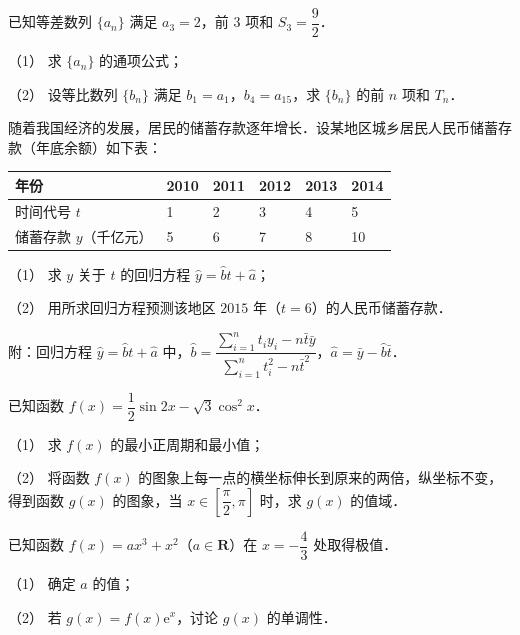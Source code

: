 \begin{question}
已知等差数列 $\{a_{n}\}$ 满足 $a_{3}=2$，前 $3$ 项和 $S_{3}=\dfrac{9}{2}$．

（1） 求 $\{a_{n}\}$ 的通项公式；

（2） 设等比数列 $\{b_{n}\}$ 满足 $b_{1}=a_{1}$，$b_{4}=a_{15}$，求 $\{b_{n}\}$ 的前 $n$ 项和 $T_{n}$．

\end{question}
\begin{question}
随着我国经济的发展，居民的储蓄存款逐年增长．设某地区城乡居民人民币储蓄存款（年底余额）如下表：

\begin{center}
\begin{tabular}{llllll}
\toprule
年份 & 2010 & 2011 & 2012 & 2013 & 2014 \\
\midrule
时间代号 $t$ & 1 & 2 & 3 & 4 & 5 \\
储蓄存款 $y$（千亿元） & 5 & 6 & 7 & 8 & 10 \\
\bottomrule
\end{tabular}
\end{center}

（1） 求 $y$ 关于 $t$ 的回归方程 $\hat{y}=\hat{b}t+\hat{a}$；

（2） 用所求回归方程预测该地区 $2015$ 年（$t=6$）的人民币储蓄存款．

附：回归方程 $\hat{y}=\hat{b}t+\hat{a}$ 中，$\hat{b}=\dfrac{\sum\limits_{i=1}^{n}t_{i}y_{i}-n\bar{t}\bar{y}}{\sum\limits_{i=1}^{n}t_{i}^{2}-n\bar{t}^{2}}$，$\hat{a}=\bar{y}-\hat{b}\bar{t}$．

\end{question}
\begin{question}
已知函数 $f(x)=\dfrac{1}{2}\sin 2x-\sqrt{3}\cos^{2}x$．

（1） 求 $f(x)$ 的最小正周期和最小值；

（2） 将函数 $f(x)$ 的图象上每一点的横坐标伸长到原来的两倍，纵坐标不变，得到函数 $g(x)$ 的图象，当 $x\in\left[\dfrac{\pi}{2},\pi\right]$ 时，求 $g(x)$ 的值域．

\end{question}
\begin{question}
已知函数 $f(x)=ax^{3}+x^{2}$（$a\in\mathbf{R}$）在 $x=-\dfrac{4}{3}$ 处取得极值．

（1） 确定 $a$ 的值；

（2） 若 $g(x)=f(x)\mathrm{e}^{x}$，讨论 $g(x)$ 的单调性．

\Needspace{0.4\textheight}
\end{question}
